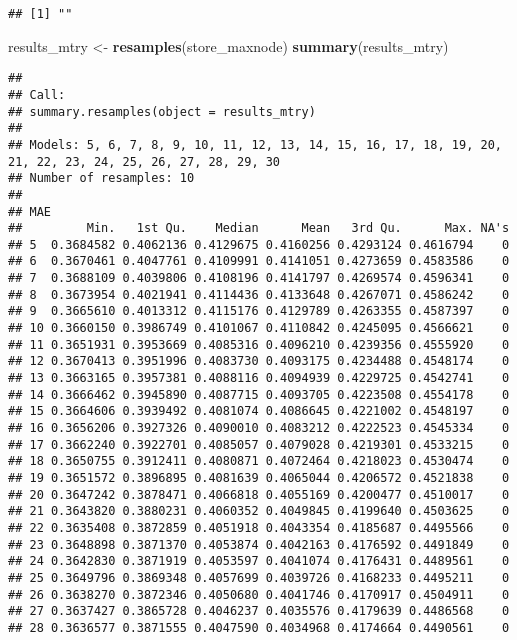 \documentclass[
]{article}
\newenvironment{Shaded}{\begin{snugshade}}{\end{snugshade}}
\newcommand{\KeywordTok}[1]{\textcolor[rgb]{0.13,0.29,0.53}{\textbf{#1}}}
\newcommand{\NormalTok}[1]{#1}
\newcommand{\StringTok}[1]{\textcolor[rgb]{0.31,0.60,0.02}{#1}}
\begin{document}
\begin{verbatim}
## [1] ""
\end{verbatim}

\begin{Shaded}
\begin{Highlighting}[]
\NormalTok{results_mtry <-}\StringTok{ }\KeywordTok{resamples}\NormalTok{(store_maxnode)}
\KeywordTok{summary}\NormalTok{(results_mtry)}
\end{Highlighting}
\end{Shaded}

\begin{verbatim}
## 
## Call:
## summary.resamples(object = results_mtry)
## 
## Models: 5, 6, 7, 8, 9, 10, 11, 12, 13, 14, 15, 16, 17, 18, 19, 20, 21, 22, 23, 24, 25, 26, 27, 28, 29, 30 
## Number of resamples: 10 
## 
## MAE 
##         Min.   1st Qu.    Median      Mean   3rd Qu.      Max. NA's
## 5  0.3684582 0.4062136 0.4129675 0.4160256 0.4293124 0.4616794    0
## 6  0.3670461 0.4047761 0.4109991 0.4141051 0.4273659 0.4583586    0
## 7  0.3688109 0.4039806 0.4108196 0.4141797 0.4269574 0.4596341    0
## 8  0.3673954 0.4021941 0.4114436 0.4133648 0.4267071 0.4586242    0
## 9  0.3665610 0.4013312 0.4115176 0.4129789 0.4263355 0.4587397    0
## 10 0.3660150 0.3986749 0.4101067 0.4110842 0.4245095 0.4566621    0
## 11 0.3651931 0.3953669 0.4085316 0.4096210 0.4239356 0.4555920    0
## 12 0.3670413 0.3951996 0.4083730 0.4093175 0.4234488 0.4548174    0
## 13 0.3663165 0.3957381 0.4088116 0.4094939 0.4229725 0.4542741    0
## 14 0.3666462 0.3945890 0.4087715 0.4093705 0.4223508 0.4554178    0
## 15 0.3664606 0.3939492 0.4081074 0.4086645 0.4221002 0.4548197    0
## 16 0.3656206 0.3927326 0.4090010 0.4083212 0.4222523 0.4545334    0
## 17 0.3662240 0.3922701 0.4085057 0.4079028 0.4219301 0.4533215    0
## 18 0.3650755 0.3912411 0.4080871 0.4072464 0.4218023 0.4530474    0
## 19 0.3651572 0.3896895 0.4081639 0.4065044 0.4206572 0.4521838    0
## 20 0.3647242 0.3878471 0.4066818 0.4055169 0.4200477 0.4510017    0
## 21 0.3643820 0.3880231 0.4060352 0.4049845 0.4199640 0.4503625    0
## 22 0.3635408 0.3872859 0.4051918 0.4043354 0.4185687 0.4495566    0
## 23 0.3648898 0.3871370 0.4053874 0.4042163 0.4176592 0.4491849    0
## 24 0.3642830 0.3871919 0.4053597 0.4041074 0.4176431 0.4489561    0
## 25 0.3649796 0.3869348 0.4057699 0.4039726 0.4168233 0.4495211    0
## 26 0.3638270 0.3872346 0.4050680 0.4041746 0.4170917 0.4504911    0
## 27 0.3637427 0.3865728 0.4046237 0.4035576 0.4179639 0.4486568    0
## 28 0.3636577 0.3871555 0.4047590 0.4034968 0.4174664 0.4490561    0

\end{verbatim}
\end{document}

